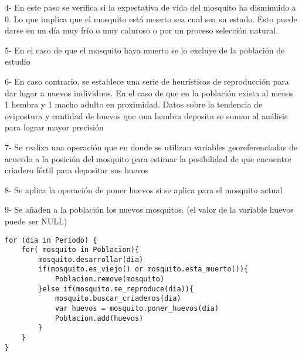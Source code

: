 4- En este paso se verifica si la expectativa de vida del mosquito ha
disminuido a 0. Lo que implica que el mosquito está muerto sea cual sea
su estado. Esto puede darse en un día muy frío o muy caluroso o por un proceso
selección natural.

5- En el caso de que el mosquito haya muerto se lo excluye de la
población de estudio

6- En caso contrario, se establece una serie de heurísticas de reproducción
para dar lugar a nuevos individuos. En el caso de que en la población exista
al menos 1 hembra y 1 macho adulto en proximidad. Datos sobre la tendencia
de ovipostura y cantidad de huevos que una hembra deposita se suman al
análisis para lograr mayor precisión

7- Se realiza una operación que en donde se utilizan variables
georeferenciadas de acuerdo a la posición del mosquito para estimar
la posibilidad de que encuentre criadero fértil para depositar sus huevos

8- Se aplica la operación de poner huevos si se aplica para el mosquito actual

9- Se añaden a la población los nuevos mosquitos. (el valor de la variable
huevos puede ser NULL)



\begin{lstlisting}[caption=Pseudocódigo del proceso evolutivo, label=a_label,  float=t]
for (dia in Periodo) {
    for( mosquito in Poblacion){
        mosquito.desarrollar(dia)
        if(mosquito.es_viejo() or mosquito.esta_muerto()){
            Poblacion.remove(mosquito)
        }else if(mosquito.se_reproduce(dia)){
            mosquito.buscar_criaderos(dia)
            var huevos = mosquito.poner_huevos(dia)
            Poblacion.add(huevos)
        }
    }
}
\end{lstlisting}
